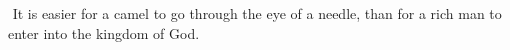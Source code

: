 \documentclass[MAIN]{subfiles}
\begin{document}
$ ${\color{red} It is easier for a camel to go through the eye of a needle, than for a rich man to enter into the kingdom of God.}
\end{document}
